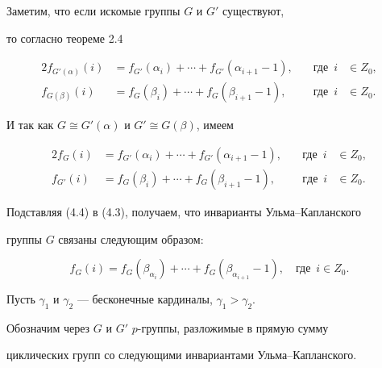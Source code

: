 \begin{pf}


Заметим, что если искомые группы $G$ и $G'$ существуют,


то согласно теореме 2.4


\begin{alignat}{2}


f_{G'(\alpha)}(i)&=f_{G'}(\alpha_i)+\dotsb+f_{G'}(\alpha_{i+1}-1),


&\quad \text{где}\ \; i&\in Z_0,\\


%


f_{G(\beta)}(i)&=f_G(\beta_i)+\dotsb+f_G(\beta_{i+1}-1),


&\quad \text{где}\ \; i&\in Z_0.


\end{alignat}


И так как $G\cong G'(\alpha)$ и $G'\cong G(\beta)$, имеем


\begin{alignat}{2}


f_G(i)&=f_{G'}(\alpha_i)+\dotsb+f_{G'}(\alpha_{i+1}-1),


&\quad \text{где}\ \; i&\in Z_0, \\


%


f_{G'}(i)&=f_G(\beta_i)+\dotsb+f_G(\beta_{i+1}-1),&\quad {где}


\ \; i&\in Z_0.


\end{alignat}


Подставляя (4.4) в (4.3), получаем, что инварианты Ульма--Капланского


группы $G$ связаны следующим образом:


\begin{equation}


f_G(i)=f_G(\beta_{\alpha_i})+\dotsb+f_G(\beta_{\alpha_{i+1}}-1),


\quad \text{где}\ \; i\in Z_0.


\end{equation}





Пусть $\gamma_1$ и $\gamma_2$ --- бесконечные кардиналы, $\gamma_1>\gamma_2$.


Обозначим через $G$ и $G'$ $p$-группы, разложимые в прямую сумму


циклических групп со следующими инвариантами Ульма--Капланского.






\end{pf}
